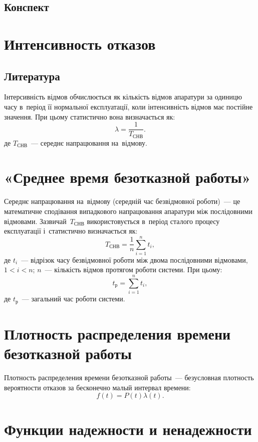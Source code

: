 \documentclass[
	a4paper,
	oneside,
	DIV = 14,
	fontsize = 14pt,
	headings = normal,
]{scrartcl}
\begin{document}
		\subsection{Конспект}

	\section{Интенсивность отказов}
		\subsection{Литература}
			Інтерсивність відмов обчислюється як кількість відмов апаратури за одиницю часу в~період її нормальної експлуатації, коли інтенсивність відмов має постійне значення. При цьому статистично вона визначається як:
			\[
				\lambda = \frac{1}{T_{\text{СНВ}}}.
			\]
			де $T_{\text{СНВ}}$~— середнє напрацювання на~відмову.

	\section{«Среднее время безотказной работы»}
		Середнє напрацювання на~відмову (середній час безвідмовної роботи)~— це математичне сподівання випадкового напрацювання апаратури між послідовними відмовами. Зазвичай~$T_{\text{СНВ}}$ використовується в~період сталого процесу експлуатації і~статистично визначається як:
			\[
				T_{\text{СНВ}} = \frac{1}{n} \sum_{i = 1}^{n} t_i,
			\]
			де $t_i$~— відрізок часу безвідмовної роботи між двома послідовними відмовами, $1 < i < n$; $n$~— кількість відмов протягом роботи системи. При цьому:
			\[
				t_{\text{р}} = \sum_{i = 1}^{n} t_i,
			\]
			де $t_{\text{р}}$~— загальний час роботи системи.

	\section{Плотность распределения времени безотказной работы}
		Плотность распределения времени безотказной работы~— безусловная плотность вероятности отказов за бесконечно малый интервал времени:
		\[
			f(t) = P(t) \lambda(t).
		\]

	\section{Функции надежности и ненадежности}
\end{document}
